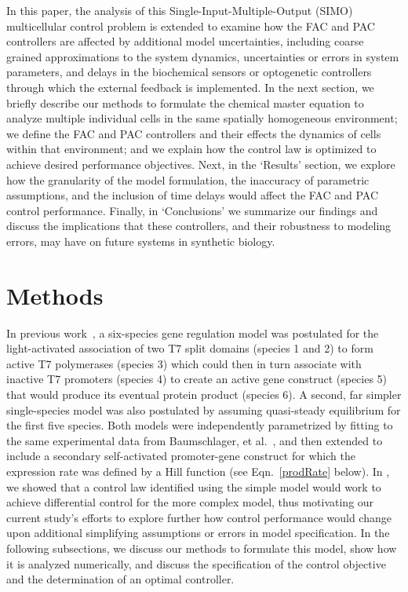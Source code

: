 \documentclass[12pt]{article}
\begin{document}
In this paper, the analysis of this Single-Input-Multiple-Output (SIMO) multicellular control problem is extended to examine how the FAC and PAC controllers are affected by additional model uncertainties, including coarse grained approximations to the system dynamics, uncertainties or errors in system parameters, and delays in the biochemical sensors or optogenetic controllers through which the external feedback is implemented. In the next section, we briefly describe our methods to formulate the chemical master equation to analyze multiple individual cells in the same spatially homogeneous environment; we define the FAC and PAC controllers and their effects the dynamics of cells within that environment; and we explain how the control law is optimized to achieve desired performance objectives. Next, in the `Results' section, we explore how the granularity of the model formulation, the inaccuracy of parametric assumptions, and the inclusion of time delays would affect the FAC and PAC control performance. Finally, in `Conclusions' we summarize our findings and discuss the implications that these controllers, and their robustness to modeling errors, may have on future systems in synthetic biology.

\section{Methods}
In previous work~\cite{May2021}, a six-species gene regulation model was postulated for the light-activated association of two T7 split domains (species 1 and 2) to form active T7 polymerases (species 3) which could then in turn associate with inactive T7 promoters (species 4) to create an active gene construct (species 5) that would produce its eventual protein product (species 6). A second, far simpler single-species model was also postulated by assuming quasi-steady equilibrium for the first five species. Both models were independently parametrized by fitting to the same experimental data from Baumschlager, et al.~\cite{XXX}, and then extended to include a secondary self-activated promoter-gene construct for which the expression rate was defined by a Hill function (see Eqn.\ \ref{prodRate} below). In \cite{May2021}, we showed that a control law identified using the simple model would work to achieve differential control for the more complex model, thus motivating our current study's efforts to explore further how control performance would change upon additional simplifying assumptions or errors in model specification.  In the following subsections, we discuss our methods to formulate this model, show how it is analyzed numerically, and discuss the specification of the control objective and the determination of an optimal controller.
\end{document}
